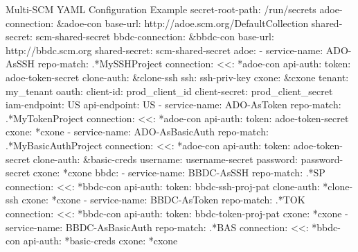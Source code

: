 \begin{code}{Multi-SCM YAML Configuration Example}{}{}
secret-root-path: /run/secrets
adoe-connection: &adoe-con
    base-url: http://adoe.scm.org/DefaultCollection
    shared-secret: scm-shared-secret
bbdc-connection: &bbdc-con
    base-url: http://bbdc.scm.org
    shared-secret: scm-shared-secret
adoe:
    - service-name: ADO-AsSSH
        repo-match: .*MySSHProject
        connection:
        <<: *adoe-con
        api-auth: 
            token: adoe-token-secret
        clone-auth: &clone-ssh
            ssh: ssh-priv-key
        cxone: &cxone
        tenant: my_tenant
        oauth:
            client-id: prod_client_id
            client-secret: prod_client_secret
        iam-endpoint: US
        api-endpoint: US
    - service-name: ADO-AsToken
        repo-match: .*MyTokenProject
        connection:
        <<: *adoe-con
        api-auth:
            token: adoe-token-secret
        cxone: *cxone
    - service-name: ADO-AsBasicAuth
        repo-match: .*MyBasicAuthProject
        connection:
        <<: *adoe-con
        api-auth:
            token: adoe-token-secret
        clone-auth: &basic-creds
            username: username-secret
            password: password-secret
        cxone: *cxone
bbdc:
    - service-name: BBDC-AsSSH
        repo-match: .*SP
        connection:
        <<: *bbdc-con
        api-auth: 
            token: bbdc-ssh-proj-pat
        clone-auth: *clone-ssh
        cxone: *cxone
    - service-name: BBDC-AsToken
        repo-match: .*TOK
        connection:
        <<: *bbdc-con
        api-auth:
            token: bbdc-token-proj-pat
        cxone: *cxone
    - service-name: BBDC-AsBasicAuth
        repo-match: .*BAS
        connection:
        <<: *bbdc-con
        api-auth: *basic-creds
        cxone: *cxone
\end{code}
